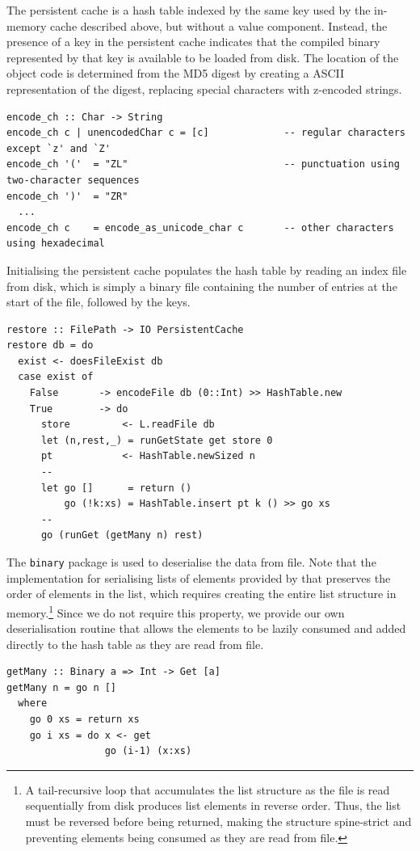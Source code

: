 The persistent cache is a hash table indexed by the same key used by the
in-memory cache described above, but without a value component. Instead, the
presence of a key in the persistent cache indicates that the compiled binary
represented by that key is available to be loaded from disk. The location of the
object code is determined from the MD5 digest by creating a ASCII representation
of the digest, replacing special characters with z-encoded strings.
%
\begin{lstlisting}[style=haskell]
encode_ch :: Char -> String
encode_ch c | unencodedChar c = [c]             -- regular characters except `z' and `Z'
encode_ch '('  = "ZL"                           -- punctuation using two-character sequences
encode_ch ')'  = "ZR"
  ...
encode_ch c    = encode_as_unicode_char c       -- other characters using hexadecimal
\end{lstlisting}

Initialising the persistent cache populates the hash table by reading an index
file from disk, which is simply a binary file containing the number of entries
at the start of the file, followed by the keys.
%
\begin{lstlisting}[style=haskell]
restore :: FilePath -> IO PersistentCache
restore db = do
  exist <- doesFileExist db
  case exist of
    False       -> encodeFile db (0::Int) >> HashTable.new
    True        -> do
      store         <- L.readFile db
      let (n,rest,_) = runGetState get store 0
      pt            <- HashTable.newSized n
      --
      let go []      = return ()
          go (!k:xs) = HashTable.insert pt k () >> go xs
      --
      go (runGet (getMany n) rest)
\end{lstlisting}

The \texttt{binary} package is used to deserialise the data from file. Note that
the implementation for serialising lists of elements provided by that preserves
the order of elements in the list, which requires creating the entire list
structure in memory.\footnote{A tail-recursive loop that accumulates the list
structure as the file is read sequentially from disk produces list elements in
reverse order. Thus, the list must be reversed before being returned, making the
structure spine-strict and preventing elements being consumed as they are read
from file.} Since we do not require this property, we provide our own
deserialisation routine that allows the elements to be lazily consumed and added
directly to the hash table as they are read from file.

\begin{lstlisting}[style=haskell]
getMany :: Binary a => Int -> Get [a]
getMany n = go n []
  where
    go 0 xs = return xs
    go i xs = do x <- get
                 go (i-1) (x:xs)
\end{lstlisting}

